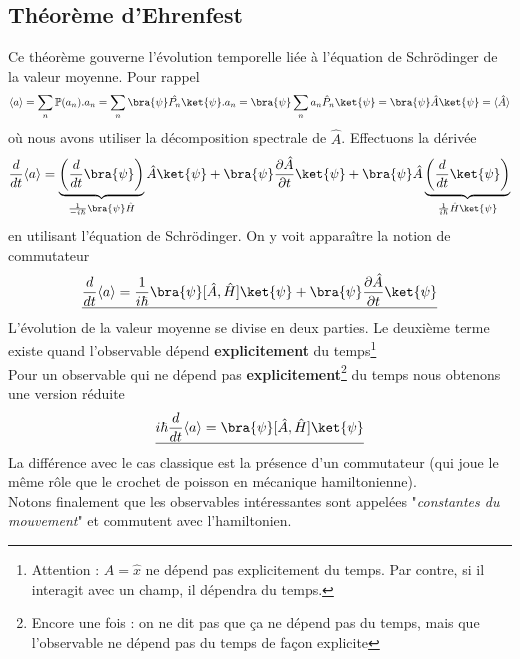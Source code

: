 	\subsection{Théorème d'Ehrenfest}
	Ce théorème gouverne l'évolution temporelle liée à l'équation de Schrödinger de la 
	valeur moyenne. Pour rappel
	\begin{equation}
	\langle a \rangle = \sum_n \mathbb{P}(a_n).a_n = \sum_n \bra{\psi}\hat{P_n}\ket{\psi} .a_n
	= \bra{\psi}\sum_n a_n \hat P_n \ket{\psi} = \bra{\psi}\hat{A}\ket{\psi} = \langle\hat{A}
	\rangle
	\end{equation}
	où nous avons utiliser la décomposition spectrale de $\hat{A}$. Effectuons la dérivée
	\begin{equation}
	\dfrac{d}{dt}\langle a\rangle = \underbrace{\left(\dfrac{d}{dt}\bra{\psi}\right)}_{\frac{1}{-i\hbar}
	\bra{\psi}\hat{H}}\hat{A}\ket{\psi} + \bra{\psi}\dfrac{\partial \hat{A}}{\partial t}\ket{\psi} +
	\bra{\psi}\hat{A}\underbrace{\left(\dfrac{d}{dt}\ket{\psi}\right)}_{\frac{1}{i\hbar}\hat{H}\ket{\psi}}
	\end{equation}
	en utilisant l'équation de Schrödinger.
	On y voit apparaître la notion de commutateur
	\begin{equation}
	\underline{\dfrac{d}{dt}\langle a\rangle = \dfrac{1}{i\hbar}\bra{\psi}[\hat{A},\hat{H}]\ket{\psi} + 
	\bra{\psi}\dfrac{\partial\hat{A}}{\partial t}\ket{\psi}}
	\end{equation}
	L'évolution de la valeur moyenne se divise en deux parties. Le deuxième terme existe quand 
	l'observable dépend \textbf{explicitement} du temps\footnote{Attention : $\hat{A} = \hat{x}$ ne 
	dépend pas explicitement du temps. Par contre, si il interagit avec un champ, il dépendra du 
	temps.} \\
	
	Pour un observable qui ne dépend pas \textbf{explicitement}\footnote{Encore une fois : on ne 
	dit pas que ça ne dépend pas du temps, mais que l'observable ne dépend pas du temps de façon 
	explicite} du temps nous obtenons une version réduite
	\begin{equation}
	\underline{i\hbar \dfrac{d}{dt}\langle a\rangle = \bra{\psi}[\hat{A},\hat{H}]\ket{\psi}}
	\end{equation}
	La différence avec le cas classique est la présence d'un commutateur (qui joue le même rôle 
	que le crochet de poisson en mécanique hamiltonienne).\\
	
	Notons finalement que les observables intéressantes sont appelées "\textit{constantes du mouvement}" et commutent
	avec l'hamiltonien.

